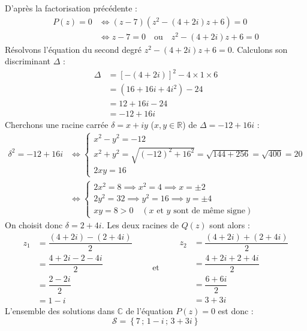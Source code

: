 \documentclass[12pt,a4paper]{article}
\begin{document}
\begin{enumerate}
    D'après la factorisation précédente :
    $$
    \begin{aligned}
        P(z) = 0 &\iff (z - 7)\left(z^2 - (4 + 2i)z + 6\right) = 0 \\
        &\iff z - 7 = 0 \quad \text{ou} \quad z^2 - (4 + 2i)z + 6 = 0
    \end{aligned}
    $$
    Résolvons l'équation du second degré $z^2 - (4 + 2i)z + 6 = 0$. Calculons son discriminant $\Delta$ :
    $$
    \begin{aligned}
        \Delta &= \left[-(4 + 2i)\right]^2 - 4 \times 1 \times 6 \\
        &= (16 + 16i + 4i^2) - 24 \\
        &= 12 + 16i - 24 \\
        &= -12 + 16i
    \end{aligned}
    $$
    Cherchons une racine carrée $\delta = x + iy$ ($x, y \in \mathbb{R}$) de $\Delta = -12 + 16i$ :
    $$
    \begin{aligned}
        \delta^2 = -12 + 16i &\iff
        \left\{
        \begin{array}{l}
            x^2 - y^2 = -12 \\
            x^2 + y^2 = \sqrt{(-12)^2 + 16^2} = \sqrt{144 + 256} = \sqrt{400} = 20 \\
            2xy = 16
        \end{array}
        \right. \\
        &\iff
        \left\{
        \begin{array}{l}
            2x^2 = 8 \implies x^2 = 4 \implies x = \pm 2 \\
            2y^2 = 32 \implies y^2 = 16 \implies y = \pm 4 \\
            xy = 8 > 0 \quad (x \text{ et } y \text{ sont de même signe})
        \end{array}
        \right.
    \end{aligned}
    $$
    On choisit donc $\delta = 2 + 4i$. Les deux racines de $Q(z)$ sont alors :
    $$
    \begin{aligned}
        z_1 &= \dfrac{(4 + 2i) - (2 + 4i)}{2} \\
        &= \dfrac{4 + 2i - 2 - 4i}{2} \\
        &= \dfrac{2 - 2i}{2} \\
        &= 1 - i
    \end{aligned}
    \qquad \text{et} \qquad
    \begin{aligned}
        z_2 &= \dfrac{(4 + 2i) + (2 + 4i)}{2} \\
        &= \dfrac{4 + 2i + 2 + 4i}{2} \\
        &= \dfrac{6 + 6i}{2} \\
        &= 3 + 3i
    \end{aligned}
    $$
    L'ensemble des solutions dans $\mathbb{C}$ de l'équation $P(z) = 0$ est donc :
    $$
    \mathcal{S} = \left\{ 7 \,;\, 1 - i \,;\, 3 + 3i \right\}
    $$
\end{enumerate}
\end{document}

